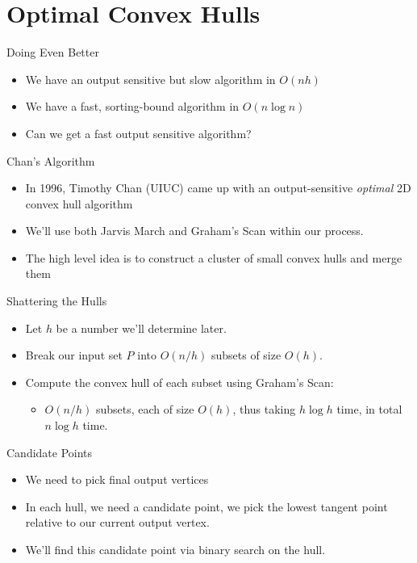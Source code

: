 \documentclass[aspectratio=169]{beamer}
\begin{document}
\section{Optimal Convex Hulls}
\frame{\sectionpage}

\begin{frame}{Doing Even Better}
    \begin{itemize}
    \item We have an output sensitive but slow algorithm in $O(nh)$
    \item We have a fast, sorting-bound algorithm in $O(n \log n)$
    \item Can we get a fast output sensitive algorithm?
    \end{itemize}
\end{frame}

\begin{frame}{Chan's Algorithm}
\begin{itemize}
    \item In 1996, Timothy Chan (UIUC) came up with an output-sensitive \textit{optimal} 2D convex hull algorithm \pause
    \item We'll use both Jarvis March and Graham's Scan within our process.
    \item The high level idea is to construct a cluster of small convex hulls and merge them
\end{itemize}
\end{frame}

\begin{frame}{Shattering the Hulls}
    \begin{itemize}
        \item Let $h$ be a number we'll determine later. \pause
        \item Break our input set $P$ into $O(n/h)$ subsets of size $O(h)$. \pause 
        \item Compute the convex hull of each subset using Graham's Scan: \pause 
        \begin{itemize}
            \item $O(n/h)$ subsets, each of size $O(h)$, thus taking $h \log h$ time, in total $n \log h$ time.
        \end{itemize}
    \end{itemize}
\end{frame}

\begin{frame}{Candidate Points}
    \begin{itemize}
        \item We need to pick final output vertices
        \item In each hull, we need a candidate point, we pick the lowest tangent point relative to our current output vertex.
        \item We'll find this candidate point via binary search on the hull.
    \end{itemize}
\end{frame}
\end{document}
